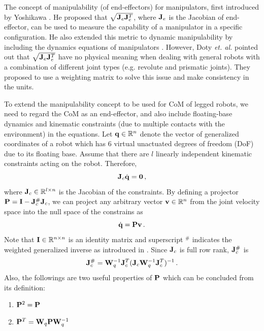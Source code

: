 The concept of manipulability (of end-effectors) for manipulators, first
introduced by Yoshikawa \cite{Yoshikawa85a}.  He proposed that $\sqrt{\mathbf{J}_e
  \mathbf{J}_e^T}$, where $\mathbf{J}_e$ is the Jacobian of end-effector, can be used to
measure the capability of a manipulator in a specific configuration.  He also
extended this metric to dynamic manipulability by including the dynamics
equations of manipulators \cite{Yoshikawa85}.  However, Doty \textit{et. al.}
\cite{Dotyetal95} pointed out that $\sqrt{\mathbf{J}_e \mathbf{J}_e^T}$ have no physical
meaning when dealing with general robots with a combination of different joint
types (e.g. revolute and prismatic joints).  They proposed to use a weighting
matrix to solve this issue and make consistency in the units.

To extend the manipulability concept to be used for CoM of legged robots, we
need to regard the CoM as an end-effector, and also include floating-base
dynamics and kinematic constraints (due to multiple contacts with the
environment) in the equations.  Let $\mathbf{q} \in \mathbb{R}^n$ denote the vector of
generalized coordinates of a robot which has $6$ virtual unactuated degrees of
freedom (DoF) due to its floating base.  Assume that there are $l$ linearly
independent kinematic constraints acting on the robot.  Therefore,
%
\begin{equation}
  \mathbf{J}_c \dot{\mathbf{q}} = \mathbf{0} \, ,
\end{equation}
%
where $\mathbf{J}_c \in \mathbb{R}^{l \times n}$ is the Jacobian of the constraints.  By
defining a projector $\mathbf{P} = \mathbf{I} - \mathbf{J}_c^{\#} \mathbf{J}_c$, we can project any
arbitrary vector $\mathbf{v} \in \mathbb{R}^n$ from the joint velocity space into the null
space of the constrains as
%
\begin{equation}
  \dot{\mathbf{q}} = \mathbf{P} \mathbf{v} \, .
  \label{qdot=Pv}
\end{equation}
%
Note that $\mathbf{I} \in \mathbb{R}^{n \times n}$ is an identity matrix and superscript
${}^\#$ indicates the weighted generalized inverse as introduced in
\cite{Dotyetal93}.  Since $\mathbf{J}_c$ is full row rank, $\mathbf{J}_c^\#$ is
%
\begin{equation}
  \mathbf{J}_c^\# = \mathbf{W}_q^{-1}\mathbf{J}_c^T (\mathbf{J}_c \mathbf{W}_q^{-1} \mathbf{J}_c^T)^{-1} \, .
  \label{Jc+}
\end{equation}
%
Also, the followings are two useful properties of $\mathbf{P}$ which can be concluded
from its definition:
%
\begin{enumerate}
\item $\mathbf{P}^2 = \mathbf{P}$
\item $\mathbf{P}^T = \mathbf{W}_q \mathbf{P} \mathbf{W}_q^{-1}$
\end{enumerate}
%

